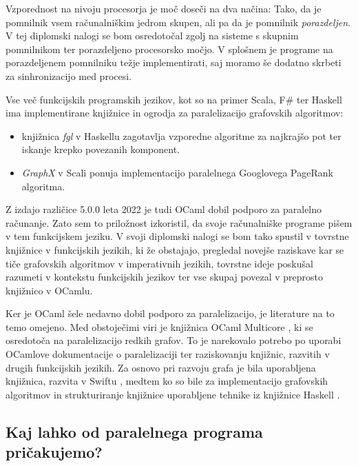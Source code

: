 \documentclass[mat1, tisk]{fmfdelo}
\begin{document}
Vzporednost na nivoju procesorja je moč doseči na dva načina: 
Tako, da je pomnilnik vsem računalniškim jedrom skupen, ali pa da je pomnilnik \textit{porazdeljen}. 
V tej diplomski nalogi se bom osredotočal zgolj na sisteme s skupnim pomnilnikom ter porazdeljeno procesorsko močjo.
V splošnem je programe na porazdeljenem pomnilniku težje implementirati, saj moramo še dodatno skrbeti za sinhronizacijo
med procesi.

Vse več funkcijskih programskih jezikov, kot so na primer Scala, F\# ter Haskell ima implementirane knjižnice
in ogrodja za paralelizacijo grafovskih algoritmov:
\begin{itemize}
    \item knjižnica \textit{fgl} v Haskellu \cite{haskell_fgl} zagotavlja vzporedne algoritme za najkrajšo pot 
    ter iskanje krepko povezanih komponent.
    \item \textit{GraphX} v Scali \cite{graphx} ponuja implementacijo paralelnega Googlovega PageRank algoritma.
\end{itemize}

Z izdajo različice 5.0.0 leta 2022 je tudi OCaml dobil podporo za paralelno računanje. Zato sem to priložnost 
izkoristil, da svoje računalniške programe pišem v tem funkcijskem jeziku. 
V svoji diplomski nalogi se bom tako spustil v tovrstne knjižnice v funkcijskih jezikih, ki že obstajajo, 
pregledal novejše raziskave kar se tiče grafovskih algoritmov v imperativnih jezikih, 
tovrstne ideje poskušal razumeti v kontekstu funkcijskih jezikov ter vse skupaj povezal v preprosto knjižnico v OCamlu.

Ker je OCaml šele nedavno dobil podporo za paralelizacijo, je literature na to temo omejeno.
Med obstoječimi viri je knjižnica OCaml Multicore \cite{ocaml_multicore_500}, ki se osredotoča na paralelizacijo redkih grafov.
To je narekovalo potrebo po uporabi OCamlove dokumentacije o paralelizaciji \cite{ocaml_paralelisation_documentation} ter
raziskovanju knjižnic, razvitih v drugih funkcijskih jezikih. Za osnovo pri razvoju grafa je bila uporabljena knjižnica,
razvita v Swiftu \cite{functional_swift_graph}, medtem ko so bile za implementacijo grafovskih algoritmov in strukturiranje
knjižnice uporabljene tehnike iz knjižnice Haskell \cite{haskell_fgl}.

\subsection{Kaj lahko od paralelnega programa pričakujemo?}
\end{document}
